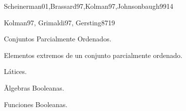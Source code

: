 \begin{syllabus}
\begin{unit}{\DSTHREEDef}{Scheinerman01,Brassard97,Kolman97,Johnsonbaugh99}{14}
\begin{topics}
      \item \DSTHREETopicNociones
      \item \DSTHREETopicEstructura
      \item \DSTHREETopicPruebas
      \item \DSTHREETopicPruebasy
      \item \DSTHREETopicPruebaspor
      \item \DSTHREETopicPruebasporcontradiccion
      \item \DSTHREETopicInduccion
      \item \DSTHREETopicInduccionfuerte
      \item \DSTHREETopicDefiniciones
      \item \DSTHREETopicEl
   \end{topics}

   \begin{unitgoals}
      \item \DSTHREEObjONE
      \item \DSTHREEObjTWO
      \item \DSTHREEObjTHREE
      \item \DSTHREEObjFOUR
   \end{unitgoals}
\end{unit}

\begin{unit}{\ARONEDef}{Kolman97, Grimaldi97, Gersting87}{19}
\begin{topics}
      \item Conjuntos Parcialmente Ordenados.
      \item Elementos extremos de un conjunto parcialmente ordenado.
      \item Látices.
      \item Ãlgebras Booleanas.
      \item Funciones Booleanas.
      \item \ARONETopicExpresiones
      \item \ARONETopicBloques
   \end{topics}
   \begin{unitgoals}
      \item \DSTHREEObjONE
      \item \DSTHREEObjTWO
      \item \DSTHREEObjTHREE
   \end{unitgoals}
\end{unit}


\end{syllabus}
